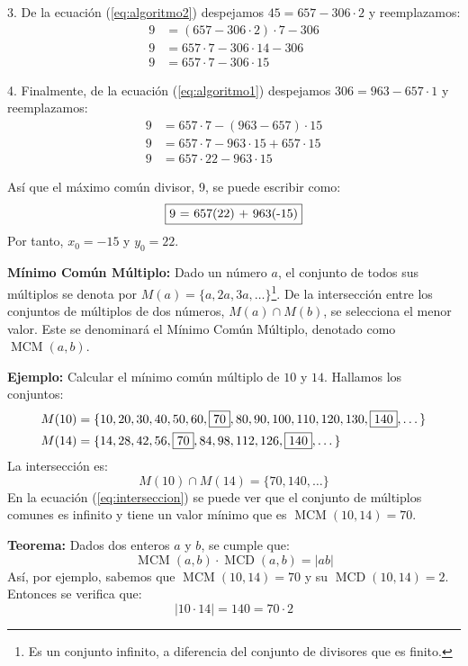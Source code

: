\begin{enumerate}
3. De la ecuación (\ref{eq:algoritmo2}) despejamos $45 = 657 - 306\cdot 2$ y reemplazamos:
\begin{align*}
    9 &= (657 - 306\cdot 2)\cdot 7 - 306 \\
    9 &= 657\cdot 7 - 306\cdot 14 - 306 \\
    9 &= 657\cdot 7 - 306\cdot 15
\end{align*}

4. Finalmente, de la ecuación (\ref{eq:algoritmo1}) despejamos $306 = 963 - 657\cdot 1$ y reemplazamos:
\begin{align*}
    9 &= 657\cdot 7 - (963 - 657)\cdot 15 \\
    9 &= 657\cdot 7 - 963\cdot 15 + 657\cdot 15 \\
    9 &= 657\cdot 22 - 963\cdot 15
\end{align*}

Así que el máximo común divisor, 9, se puede escribir como:
\[ \fbox{9 = 657(22) + 963(-15)} \]
Por tanto, $x_0 = -15$ y $y_0 = 22$.

\vspace{0.5cm}

\textbf{Mínimo Común Múltiplo:} Dado un número $a$, el conjunto de todos sus múltiplos se denota por $M(a)=\{a, 2a, 3a, \dots\}$\footnote{Es un conjunto infinito, a diferencia del conjunto de divisores que es finito.}. De la intersección entre los conjuntos de múltiplos de dos números, $M(a)\cap M(b)$, se selecciona el menor valor. Este se denominará el Mínimo Común Múltiplo, denotado como $\operatorname{MCM}(a,b)$.

\textbf{Ejemplo:} Calcular el mínimo común múltiplo de $10$ y $14$. Hallamos los conjuntos:
\begin{align*}
M(10) &= \{10,20,30,40,50,60,\fbox{70},80,90,100,110,120,130,\fbox{140},\dots\} \\
M(14) &= \{14,28,42,56,\fbox{70},84,98,112,126,\fbox{140},\dots \}
\end{align*}
La intersección es:
\begin{equation} \label{eq:interseccion}
M(10)\cap M(14) = \{70,140,\dots\}
\end{equation}
En la ecuación (\ref{eq:interseccion}) se puede ver que el conjunto de múltiplos comunes es infinito y tiene un valor mínimo que es $\operatorname{MCM}(10,14)=70$.

\textbf{Teorema:} Dados dos enteros $a$ y $b$, se cumple que:
\[ \operatorname{MCM}(a,b) \cdot \operatorname{MCD}(a,b) = |ab| \]
Así, por ejemplo, sabemos que $\operatorname{MCM}(10,14)=70$ y su $\operatorname{MCD}(10,14)=2$. Entonces se verifica que:
\[ |10\cdot 14| = 140 = 70\cdot 2 \]


\end{enumerate}
